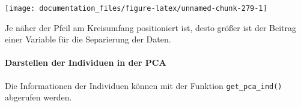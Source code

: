\documentclass[
]{article}
\begin{document}
\begin{center}\texttt{[image: documentation\_files/figure-latex/unnamed-chunk-279-1]} \end{center}

Je näher der Pfeil am Kreisumfang positioniert ist, desto größer ist der Beitrag einer Variable für die Separierung der Daten.

\hypertarget{darstellen-der-individuen-in-der-pca}{%
\paragraph{Darstellen der Individuen in der PCA}\label{darstellen-der-individuen-in-der-pca}}

Die Informationen der Individuen können mit der Funktion \texttt{get\_pca\_ind()} abgerufen werden.
\end{document}
